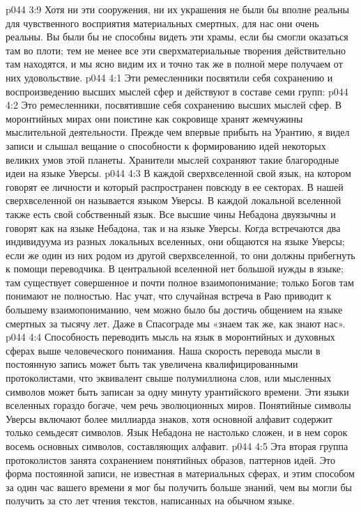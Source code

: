 \vs p044 3:9 Хотя ни эти сооружения, ни их украшения не были бы вполне реальны для чувственного восприятия материальных смертных, для нас они очень реальны. Вы были бы не способны видеть эти храмы, если бы смогли оказаться там во плоти; тем не менее все эти сверхматериальные творения действительно там находятся, и мы ясно видим их и точно так же в полной мере получаем от них удовольствие.
\vs p044 4:1 Эти ремесленники посвятили себя сохранению и воспроизведению высших мыслей сфер и действуют в составе семи групп:
\vs p044 4:2 \bibnobreakspace {} Это ремесленники, посвятившие себя сохранению высших мыслей сфер. В моронтийных мирах они поистине как сокровище хранят жемчужины мыслительной деятельности. Прежде чем впервые прибыть на Урантию, я видел записи и слышал вещание о способности к формированию идей некоторых великих умов этой планеты. Хранители мыслей сохраняют такие благородные идеи на языке Уверсы.
\vs p044 4:3 В каждой сверхвселенной свой язык, на котором говорят ее личности и который распространен повсюду в ее секторах. В нашей сверхвселенной он называется языком Уверсы. В каждой локальной вселенной также есть свой собственный язык. Все высшие чины Небадона двуязычны и говорят как на языке Небадона, так и на языке Уверсы. Когда встречаются два индивидуума из разных локальных вселенных, они общаются на языке Уверсы; если же один из них родом из другой сверхвселенной, то они должны прибегнуть к помощи переводчика. В центральной вселенной нет большой нужды в языке; там существует совершенное и почти полное взаимопонимание; только Богов там понимают не полностью. Нас учат, что случайная встреча в Раю приводит к большему взаимопониманию, чем можно было бы достичь общением на языке смертных за тысячу лет. Даже в Спасограде мы «знаем так же, как знают нас».
\vs p044 4:4 Способность переводить мысль на язык в моронтийных и духовных сферах выше человеческого понимания. Наша скорость перевода мысли в постоянную запись может быть так увеличена квалифицированными протоколистами, что эквивалент свыше полумиллиона слов, или мысленных символов может быть записан за одну минуту урантийского времени. Эти языки вселенных гораздо богаче, чем речь эволюционных миров. Понятийные символы Уверсы включают более миллиарда знаков, хотя основной алфавит содержит только семьдесят символов. Язык Небадона не настолько сложен, и в нем сорок восемь основных символов, составляющих алфавит.
\vs p044 4:5 \bibnobreakspace {} Эта вторая группа протоколистов занята сохранением понятийных образов, паттернов идей. Это форма постоянной записи, не известная в материальных сферах, и этим способом за один час вашего времени я мог бы получить больше знаний, чем вы могли бы получить за сто лет чтения текстов, написанных на обычном языке.
